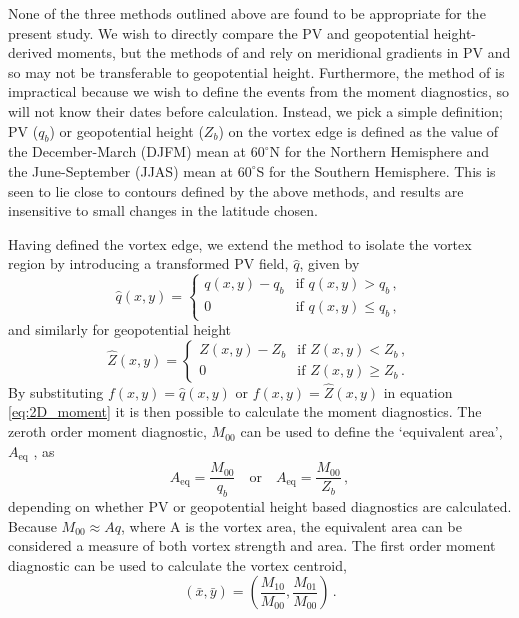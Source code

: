 None of the three methods outlined above are found to be appropriate for the
present study. We wish to directly compare the PV and geopotential
height-derived moments, but the methods of \citet{Waugh1999} and
\citet{Nash1996} rely on meridional gradients in PV and so may not be
transferable to geopotential height. Furthermore, the method of
\citet{Matthewman2009} is impractical because we wish to define the events from
the moment diagnostics, so will not know their dates before
calculation. Instead, we pick a simple definition; PV ($q_{b}$) or geopotential
height ($Z_{b}$) on the vortex edge is defined as the value of the
December-March (DJFM) mean at $60^{\circ}$N for the Northern Hemisphere and the
June-September (JJAS) mean at $60^{\circ}$S for the Southern Hemisphere. This is
seen to lie close to contours defined by the above methods, and results are
insensitive to small changes in the latitude chosen.

Having defined the vortex edge, we extend the method \citet{Matthewman2009} to
isolate the vortex region by introducing a transformed PV field, $\hat{q}$,
given by
\begin{equation}
 \hat{q}(x,y) = 
 \begin{cases}
   q(x,y) - q_{b} & \text{if $q(x,y) > q_{b}$} \, , \\
   0 & \text{if $q(x,y) \leq q_{b}$} \, , 
 \end{cases}
\end{equation}
and similarly for geopotential height 
\begin{equation}
 \hat{Z}(x,y) = 
 \begin{cases}
   Z(x,y) - Z_{b} & \text{if $Z(x,y) < Z_{b}$} \, , \\
   0 & \text{if $Z(x,y) \geq Z_{b}$} \, . 
 \end{cases}
\end{equation}
By substituting $f(x,y) = \hat{q}(x,y)$ or $f(x,y) = \hat{Z}(x,y)$ in equation
\ref{eq:2D_moment} it is then possible to calculate the moment diagnostics. The
zeroth order moment diagnostic, $M_{00}$ can be used to define the `equivalent
area', $A_{\mathrm{eq}}$ \citep{Matthewman2009}, as
\begin{equation} 
A_{\mathrm{eq}} = \frac{M_{00}}{q_{b}}\quad \text{or} \quad A_{\mathrm{eq}} = \frac{M_{00}}{Z_b}\, ,
\end{equation}
depending on whether PV or geopotential height based diagnostics are
calculated. Because $M_{00} \approx Aq$, where A is the vortex area, the
equivalent area can be considered a measure of both vortex strength and
area. The first order moment diagnostic can be used to calculate the vortex
centroid,
\begin{equation}
(\bar{x}, \bar{y}) = \left( \frac{M_{10}}{M_{00}}, \frac{M_{01}}{M_{00}} \right)
\, . 
\end{equation}

